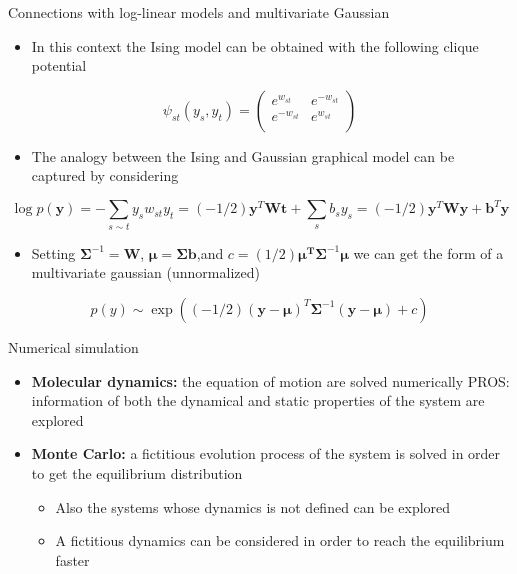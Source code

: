 \documentclass{beamer}
\begin{document}
\begin{frame}{Connections with log-linear models and multivariate Gaussian   \cite{murphy2012machine}}
\begin{itemize}
\item In this context the Ising model can be obtained with the following clique potential 
\end{itemize}
\begin{equation}
\psi_{st}\left(y_{s},y_{t}\right) =
\begin{pmatrix}
e^{w_{st}} & e^{-w_{st}} \\
e^{-w_{st}} & e^{w_{st}} \\
\end{pmatrix}
\end{equation}
\begin{itemize}
\item The analogy between the Ising and Gaussian graphical model can be captured by considering 
\end{itemize}
\begin{equation*}
\log p(\textbf{y})=-\sum_{s\sim t}y_{s}w_{st}y_{t}=(-1/2)\textbf{y}^{T}\textbf{W}\textbf{t}+\sum_{s}b_{s}y_{s}=(-1/2)\textbf{y}^{T}\textbf{W}\textbf{y}+\textbf{b}^{T}\textbf{y}
\end{equation*}
\begin{itemize}
\item Setting $\bm{\Sigma}^{-1}=\textbf{W}$, $\bm{\mu}=\bm{\Sigma} \textbf{b}$,and $c=(1/2)\bm{\mu^{T}}\bm{\Sigma}^{-1}\bm{\mu}$ we can get the form of a multivariate gaussian (unnormalized)
\end{itemize}
\begin{equation*}
p(y)\sim \exp \left((-1/2)(\textbf{y}-\bm{\mu})^{T}\bm{\Sigma}^{-1}(\textbf{y}-\bm{\mu})+c\right)
\end{equation*}
\end{frame}


\begin{frame}{Numerical simulation \cite{peliti2011statistical}}
\begin{itemize}
\item\textbf{Molecular dynamics:} the equation of motion are solved numerically PROS: information of both the dynamical and static properties of the system are explored 
\item\textbf{Monte Carlo:} a fictitious evolution process of the system is solved in order to get the equilibrium distribution
  \begin{itemize}
  \item Also the systems whose dynamics is not defined can be explored
  \item A fictitious dynamics can be considered in order to reach the equilibrium faster 
  \end{itemize} 
\end{itemize}
\end{frame}
\end{document}
